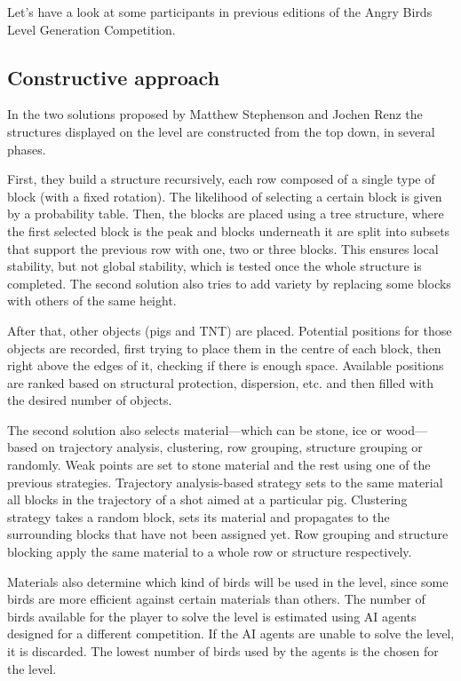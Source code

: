 Let's have a look at some participants in previous editions of the Angry Birds Level Generation Competition.

\subsection{Constructive approach}
In the two solutions proposed by Matthew Stephenson and Jochen Renz \cite{stephenson2017generating} \cite{stephenson2016procedural} the structures displayed on the level are constructed from the top down, in several phases. 

First, they build a structure recursively, each row composed of a single type of block (with a fixed rotation). The likelihood of selecting a certain block is given by a probability table. Then, the blocks are placed using a tree structure, where the first selected block is the peak and blocks underneath it are split into subsets that support the previous row with one, two or three blocks. This ensures local stability, but not global stability, which is tested once the whole structure is completed. The second solution also tries to add variety by replacing some blocks with others of the same height.

After that, other objects (pigs and TNT) are placed. Potential positions for those objects are recorded, first trying to place them in the centre of each block, then right above the edges of it, checking if there is enough space. Available positions are ranked based on structural protection, dispersion, etc. and then filled with the desired number of objects.

The second solution also selects material---which can be stone, ice or wood---based on trajectory analysis, clustering, row grouping, structure grouping or randomly. Weak points are set to stone material and the rest using one of the previous strategies. Trajectory analysis-based strategy sets to the same material all blocks in the trajectory of a shot aimed at a particular pig. Clustering strategy takes a random block, sets its material and propagates to the surrounding blocks that have not been assigned yet. Row grouping and structure blocking apply the same material to a whole row or structure respectively.

Materials also determine which kind of birds will be used in the level, since some birds are more efficient against certain materials than others. The number of birds available for the player to solve the level is estimated using AI agents designed for a different competition. If the AI agents are unable to solve the level, it is discarded. The lowest number of birds used by the agents is the chosen for the level.


